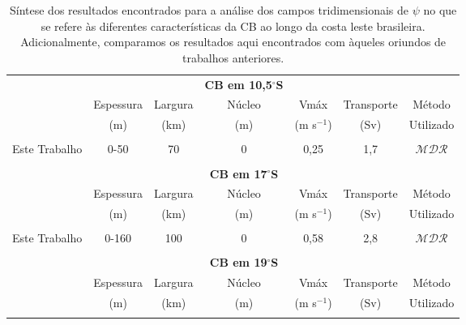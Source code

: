 \begin{table}
\caption{\label{tab:cb} \small Síntese dos resultados encontrados para a análise dos campos tridimensionais de 
$\psi$ no que se refere às diferentes características da CB ao longo da costa leste brasileira. Adicionalmente, 
comparamos os resultados aqui encontrados com àqueles oriundos de trabalhos anteriores.}
\begin{center}
\begin{sideways}
\renewcommand{\baselinestretch}{2}
\begin{tabular}{|lcccccc|}
\hline 
 & & & {\bf CB em 10,5$^\circ$S} & & &\\ 
 & Espessura & Largura  & Núcleo & Vmáx & Transporte &  Método \vspace{-0.1cm}\\
 & (m) & (km) & (m) & (m s$^{-1}$) & (Sv) & Utilizado\\
\hline 
 & & & & & &\vspace{-0.4cm}\\
 Este Trabalho  & 0-50 & 70 & 0 & 0,25 & 1,7 & $\mathcal{MDR}$ \vspace{0.1cm} \\ 
\hline
 & & & & & &\vspace{-0.4cm}\\
 & & & {\bf CB em 17$^\circ$S} & & &\\  
& Espessura & Largura  & Núcleo & Vmáx & Transporte & Método \vspace{-0.1cm}\\
& (m) & (km) & (m) & (m s$^{-1}$) & (Sv) & Utilizado\\
\hline 
 & & & & & &\vspace{-0.4cm}\\
 Este Trabalho  & 0-160 & 100 & 0 & 0,58 & 2,8 & $\mathcal{MDR}$ \vspace{0.1cm} \\
\hline
 & & & & & &\vspace{-0.4cm}\\
 & & & {\bf CB em 19$^\circ$S} & & &\\  
& Espessura & Largura  & Núcleo & Vmáx & Transporte & Método \vspace{-0.1cm}\\
& (m) & (km) & (m) & (m s$^{-1}$) & (Sv) & Utilizado\\
\hline 
 & & & & & &\vspace{-0.4cm}\\

\end{tabular}
\end{sideways}
\end{center}
\end{table}
